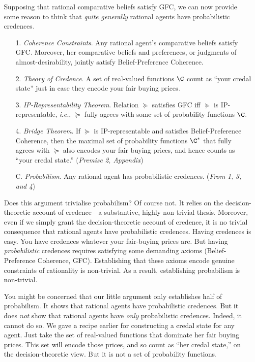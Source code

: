 Supposing that rational comparative beliefs satisfy GFC, we can now provide some reason to think that \textit{quite generally} rational agents have probabilistic credences.
\begin{enumerate}
\item[1.] \textit{Coherence Constraints}. Any rational agent's comparative beliefs satisfy GFC. Moreover, her comparative beliefs and preferences, or judgments of almost-desirability, jointly satisfy Belief-Preference Coherence.
\item[2.] \textit{Theory of Credence}. A set of real-valued functions $\C$ count as ``your credal state'' just in case they encode your fair buying prices.
\item[3.] \textit{IP-Representability Theorem}. Relation $\succeq$ satisfies GFC iff $\succeq$ is IP-representable, \textit{i.e.}, $\succeq$ fully agrees with some set of probability functions $\C$.
\item[4.] \textit{Bridge Theorem}. If $\succeq$ is IP-representable and satisfies Belief-Preference Coherence, then the maximal set of probability functions $\C^*$ that fully agrees with $\succeq$ also encodes your fair buying prices, and hence counts as ``your credal state.'' (\textit{Premise 2, Appendix})
\item[C.] \textit{Probabilism}. Any rational agent has probabilistic credences. (\textit{From 1, 3, and 4})
\end{enumerate}
Does this argument trivialise probabilism? Of course not. It relies on the decision-theoretic account of credence---a substantive, highly non-trivial thesis. Moreover, even if we simply grant the decision-theoretic account of credence, it is no trivial consequence that rational agents have probabilistic credences. Having credences is easy. You have credences whatever your fair-buying prices are. But having \textit{probabilistic} credences requires satisfying some demanding axioms (Belief-Preference Coherence, GFC). Establishing that these axioms encode genuine constraints of rationality is non-trivial. As a result, establishing probabilism is non-trivial.

You might be concerned that our little argument only establishes half of probabilism. It shows that rational agents have probabilistic credences. But it does \textit{not} show that rational agents have \textit{only} probabilistic credences. Indeed, it cannot do so. We gave a recipe earlier for constructing a credal state for any agent. Just take the set of real-valued functions that dominate her fair buying prices. This set will encode those prices, and so count as ``her credal state,'' on the decision-theoretic view. But it is not a set of probability functions.

